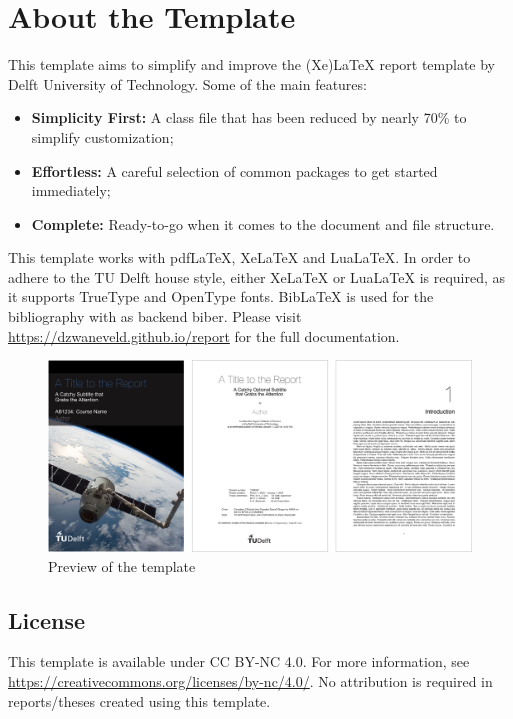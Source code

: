 \chapter{About the Template}

This template aims to simplify and improve the (Xe)LaTeX report template by Delft University of Technology. Some of the main features:

\begin{itemize}
  \item \textbf{Simplicity First:} A class file that has been reduced by nearly 70\% to simplify customization;
  \item \textbf{Effortless:} A careful selection of common packages to get started immediately;
  \item \textbf{Complete:} Ready-to-go when it comes to the document and file structure.
\end{itemize}

\noindent This template works with pdfLaTeX, XeLaTeX and LuaLaTeX. In order to adhere to the TU Delft house style, either XeLaTeX or LuaLaTeX is required, as it supports TrueType and OpenType fonts. BibLaTeX is used for the bibliography with as backend biber. Please visit \url{https://dzwaneveld.github.io/report} for the full documentation.

\begin{figure}[h]
    \centering
    \includegraphics[width=0.95\linewidth]{figures/template.png}
    \caption{Preview of the template}
\end{figure}

\section*{License}

\noindent This template is available under CC BY-NC 4.0. For more information, see \url{https://creativecommons.org/licenses/by-nc/4.0/}. No attribution is required in reports/theses created using this template.
